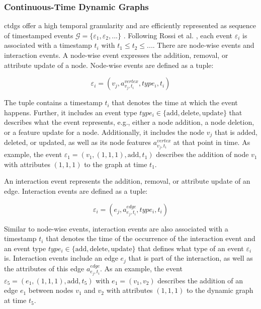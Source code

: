 \subsubsection{Continuous-Time Dynamic Graphs}
\label{s_Background_Graphs_CTDGs}

\glspl{ctdg} offer a high temporal granularity \cite{trivedi_dyrep_2019} and are efficiently represented as sequence of timestamped events $\mathcal{G} = \{\varepsilon_{1}, \varepsilon_{2}, ...\}$ \cite{rossi_temporal_2020}. Following Rossi et al. \cite{rossi_temporal_2020}, each event $\varepsilon_{i}$ is associated with a timestamp $t_i$ with $t_1 \leq t_2 \leq ...$. 
There are node-wise events and interaction events. A node-wise event expresses the addition, removal, or attribute update of a node. Node-wise events are defined as a tuple:

\begin{equation}
    \varepsilon_{i} = (v_j, a^{vertex}_{v_j, t_i}, type_{i}, t_i)
\end{equation}

The tuple contains a timestamp $t_i$ that denotes the time at which the event happens. Further, it includes an event type ${type_{i} \in \{\mathrm{add}, \mathrm{delete}, \mathrm{update}\}}$ that describes what the event represents, e.g., either a node addition, a node deletion, or a feature update for a node. Additionally, it includes the node $v_j$ that is added, deleted, or updated, as well as its node features $a^{vertex}_{v_j, t_i}$ at that point in time. As example, the event $\varepsilon_1 = (v_1, (1,1,1), \mathrm{add}, t_1)$ describes the addition of node $v_1$ with attributes $(1,1,1)$ to the graph at time $t_1$.

An interaction event represents the addition, removal, or attribute update of an edge. Interaction events are defined as a tuple:

\begin{equation}
    \varepsilon_{i} = (e_j, a^{edge}_{e_j, t_i}, type_{i}, t_i)
\end{equation}

Similar to node-wise events, interaction events are also associated with a timestamp $t_i$ that denotes the time of the occurrence of the interaction event and an event type ${type_{i} \in \{\mathrm{add}, \mathrm{delete}, \mathrm{update}\}}$ that defines what type of an event $\varepsilon_i$ is. Interaction events include an edge $e_j$ that is part of the interaction, as well as the attributes of this edge $a^{edge}_{e_j, t_i}$. As an example, the event $\varepsilon_5 = (e_1, (1,1,1), \mathrm{add}, t_5)$ with $e_1 = (v_1, v_2)$ describes the addition of an edge $e_1$ between nodes $v_1$ and $v_2$ with attributes $(1,1,1)$ to the dynamic graph at time $t_5$.

